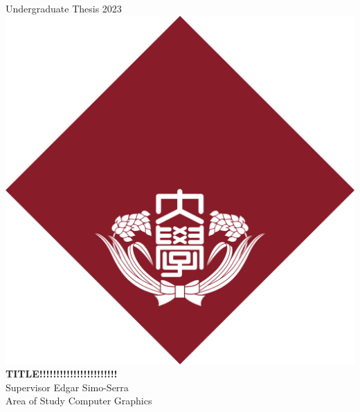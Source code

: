\documentclass[a4paper, oneside, 12pt, dvipdfmx]{book}
\begin{document}


\begin{titlepage}
\begin{center}
    \vspace{0.1\textheight}
    {\Large Undergraduate Thesis 2023} \\
    \vspace{0.05\textheight}
    \includegraphics[width=48truemm]{resources/0_title/waseda_logo.png} \\
    \vspace{0.05\textheight}
    \textbf{\huge TITLE!!!!!!!!!!!!!!!!!!!!!!!} \\
    \vfill
    {\Large Supervisor \hspace{0.02\textwidth} Edgar Simo-Serra} \\
    {\Large Area of Study \hspace{0.02\textwidth} Computer Graphics} \\

\end{center}
\end{titlepage}
\end{document}
